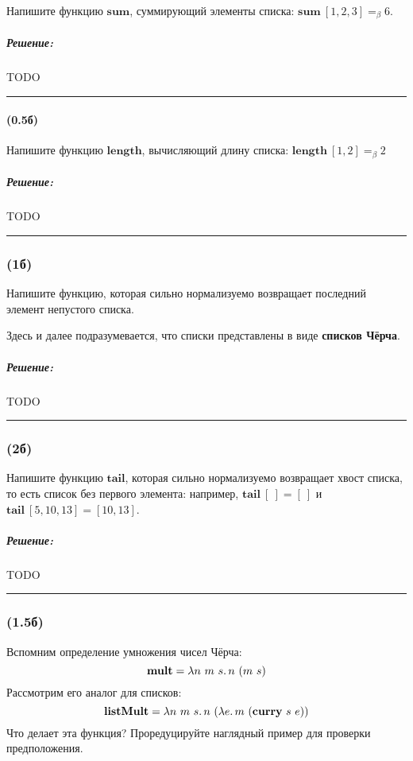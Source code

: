 \documentclass{article}
\newenvironment{proof}{\subparagraph{\hspace{-1em}Решение:\newline}}{\par\noindent\rule{\textwidth}{0.4pt}}
\newcommand{\term}[1]{\mathbf{#1}}
\newcommand{\ap}{~}
\newcommand{\eqbeta}{=_\beta}
\begin{document}
    Напишите функцию $\term{sum}$, суммирующий элементы списка: $\term{sum} \ap [1, 2, 3] \eqbeta 6$.

    \begin{proof}
        TODO %
    \end{proof}

    \paragraph{(0.5б)}

    Напишите функцию $\term{length}$, вычисляющий длину списка: $\term{length} \ap [1, 2] \eqbeta 2$

    \begin{proof}
        TODO %
    \end{proof}

    \subsubsection{(1б)}

    Напишите функцию, которая сильно нормализуемо возвращает последний элемент непустого списка.

    Здесь и далее подразумевается, что списки представлены в виде \textbf{списков Чёрча}.

    \begin{proof}
        TODO %
    \end{proof}

    \subsubsection{(2б)}

    Напишите функцию $\term{tail}$, которая сильно нормализуемо возвращает хвост списка, то есть список без первого элемента: например, $\term{tail}~[~] = [~]$ и $\term{tail}~[5,10,13] = [10, 13]$.

    \begin{proof}
        TODO %
    \end{proof}

    \subsubsection{(1.5б)}

    Вспомним определение умножения чисел Чёрча:
    \[\term{mult} = \lambda n~m~s\ldotp n~(m~s)\]
    Рассмотрим его аналог для списков:
    \[\term{listMult} = \lambda n~m~s\ldotp n~(\lambda e\ldotp m~(\term{curry}~s~e))\]
    Что делает эта функция?
    Проредуцируйте наглядный пример для проверки предположения.
\end{document}
